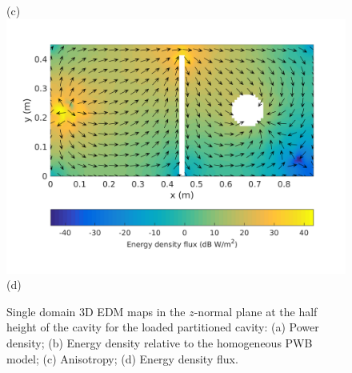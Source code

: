 \documentclass[a4paper]{article}
\numberwithin{equation}{section}
\begin{document}
\begin{figure}[ht]
\begin{center}
{\footnotesize (c)}\\
\vspace{2mm}
\includegraphics[trim={0 8mm 0 12mm},clip,width=0.52\linewidth]{figures/SDM_3D_DL_EnergyDensityFluxMap}\\
{\footnotesize (d)}\\
\vspace{-2mm}
\caption{\label{fg:partcylsdm_maps} Single domain 3D EDM maps in the $z$-normal plane at the half height of the cavity for the 
loaded partitioned cavity: (a) Power density; (b) Energy density relative to the homogeneous PWB model;
(c) Anisotropy; (d) Energy density flux.}
\end{center}
\end{figure}
\end{document}
